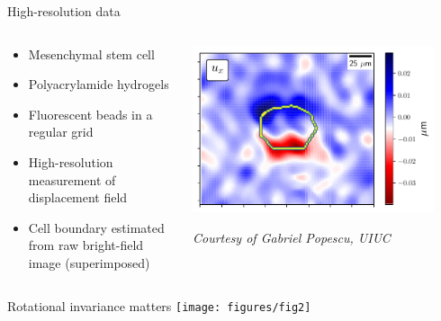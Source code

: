 \documentclass[presentation,aspectratio=169]{beamer}
\begin{document}
 \begin{frame}{High-resolution data}
 \begin{columns}
 \begin{column}{0.35\textwidth}
 \begin{itemize}
  \item Mesenchymal stem cell
 \item Polyacrylamide hydrogels
 \item  Fluorescent beads in a regular grid
 \item High-resolution measurement of displacement field
 \item Cell boundary estimated from raw bright-field image (superimposed)
 \end{itemize}
 \end{column}
 \begin{column}{0.7\textwidth}
 \centering
 \includegraphics[width=0.9\textwidth]{figures/fig0a}
  
 \emph{Courtesy of Gabriel Popescu, UIUC}
  \end{column}
  \end{columns}
 \end{frame}
 
\begin{frame}{Rotational invariance matters}
\centering
\texttt{[image: figures/fig2]}\ 
\end{frame}
\end{document}
